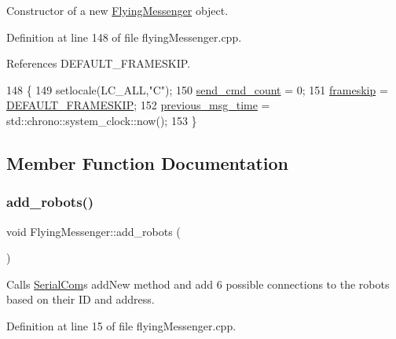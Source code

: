 Constructor of a new \hyperlink{class_flying_messenger}{Flying\+Messenger} object. 



Definition at line 148 of file flying\+Messenger.\+cpp.



References D\+E\+F\+A\+U\+L\+T\+\_\+\+F\+R\+A\+M\+E\+S\+K\+IP.


\begin{DoxyCode}
148                                  \{
149     setlocale(LC\_ALL,\textcolor{stringliteral}{"C"});
150     \hyperlink{class_flying_messenger_ac9ea18cccb4b2495daa5f90ba5aff1ab}{send\_cmd\_count} = 0;
151     \hyperlink{class_flying_messenger_af2bf887194a8483cbadb5e27d2ec6b58}{frameskip} = \hyperlink{flying_messenger_8hpp_acbe5116ba9bbd82da0b198bd335c49aa}{DEFAULT\_FRAMESKIP};
152     \hyperlink{class_flying_messenger_af8611988cd9ba1712ae9e18c7adf0e6c}{previous\_msg\_time} = std::chrono::system\_clock::now();
153 \}
\end{DoxyCode}


\subsection{Member Function Documentation}
\mbox{\label{class_flying_messenger_ab3f9bc145db951d2fd7629d04d32febc}} 
\subsubsection{\texorpdfstring{add\+\_\+robots()}{add\_robots()}}
{\footnotesize\ttfamily void Flying\+Messenger\+::add\+\_\+robots (\begin{DoxyParamCaption}{ }\end{DoxyParamCaption})\hspace{0.3cm}{\ttfamily [private]}}



Calls \hyperlink{class_serial_com}{Serial\+Com}\textquotesingle{}s add\+New method and add 6 possible connections to the robots based on their ID and address. 



Definition at line 15 of file flying\+Messenger.\+cpp.


